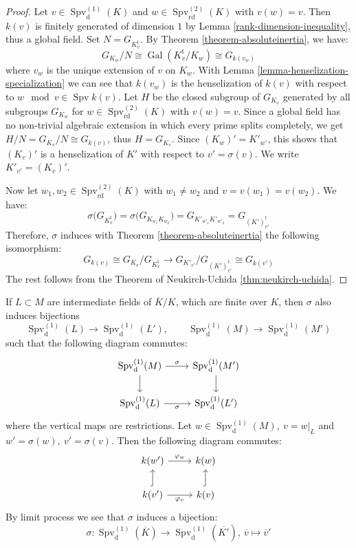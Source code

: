 \begin{proof}
Let $v\in\operatorname{Spv}_\text{d}^{(1)}(K)$ and $w\in\operatorname{Spv}_\text{rd}^{(2)}(K)$ with $v(w)=v$. Then $k(v)$ is finitely generated of dimension $1$ by Lemma \ref{rank-dimension-inequality}, thus a global field. Set $N=G_{K_v^\text{t}}$. By Theorem \ref{theorem-absoluteinertia}, we have: 
\[G_{K_w}/N \cong \operatorname{Gal}(K_v^\text{t}/K_w)\cong G_{k(v_w)}\] 
where $v_w$ is the unique extension of $v$ on $K_w$. With Lemma \ref{lemma-henselization-specialization} we can see that $k(v_w)$ is the henselization of $k(v)$ with respect to $w\mod v\in\operatorname{Spv}k(v)$. Let $H$ be the closed subgroup of $G_{K_v}$ generated by all subgroups $G_{K_w}$ for $w\in\operatorname{Spv}_\text{rd}^{(2)}(K)$ with $v(w) = v$. Since a global field has no non-trivial algebraic extension in which every prime splits completely, we get $H/N= G_{K_v}/N\cong G_{k(v)}$, thus $H=G_{K_v}$. Since $(K_w)'=K'_{w'}$, this shows that $(K_v)'$ is a henselization of $K'$ with respect to $v'=\sigma(v)$. We write $K'_{v'} = (K_v)'$. 

Now let $w_1,w_2\in\operatorname{Spv}_\text{rd}^{(2)}(K)$ with $w_1\neq w_2$ and $v=v(w_1)=v(w_2)$. We have:
\[ \sigma\big(G_{K^\text{t}_v}\big) = \sigma\big(G_{K_{w_1}K_{w_2}}\big) = G_{K'_{w'_1}K'_{w'_2}} = G_{(K')^\text{t}_{v'}} \]
Therefore, $\sigma$ induces with Theorem \ref{theorem-absoluteinertia} the following isomorphism:
\[ G_{k(v)} \cong G_{K_v}/G_{K_v^\text{t}} \to G_{K'_{v'}}/G_{(K')_{v'}^\text{t}}\cong G_{k(v')} \]
The rest follows from the Theorem of Neukirch-Uchida \ref{thm:neukirch-uchida}.
\end{proof}

\begin{remark}\label{3.3}
If $L\subset M$ are intermediate fields of $\overline{K}/K$, which are finite over $K$, then $\sigma$ also induces bijections
\[ \operatorname{Spv}_\text{d}^{(1)}(L) \to \operatorname{Spv}_\text{d}^{(1)}(L'),\qquad \operatorname{Spv}_\text{d}^{(1)}(M) \to \operatorname{Spv}_\text{d}^{(1)}(M') \]
such that the following diagram commutes:
\[\begin{tikzcd}
\operatorname{Spv}_\text{d}^{(1)}(M) \rar["\sigma"]\dar & \operatorname{Spv}_\text{d}^{(1)}(M')\dar\\
\operatorname{Spv}_\text{d}^{(1)}(L) \rar["\sigma"'] & \operatorname{Spv}_\text{d}^{(1)}(L')
\end{tikzcd}\]
where the vertical maps are restrictions. Let $w\in\operatorname{Spv}_\text{d}^{(1)}(M),\ v=w|_L$ and $w'=\sigma(w),\ v'=\sigma(v)$. Then the following diagram commutes:
\[ \begin{tikzcd}
k(w') \rar["\varphi_w"] & k(w)\\
k(v') \rar["\varphi_v"']\uar[hook] & k(v)\uar[hook]
\end{tikzcd} \]
By limit process we see that $\sigma$ induces a bijection: 
\[\sigma: \operatorname{Spv}_\text{d}^{(1)}(\overline{K})\to \operatorname{Spv}_\text{d}^{(1)}(\overline{K'}),\ \overline{v}\mapsto\overline{v}'\]
\end{remark}

